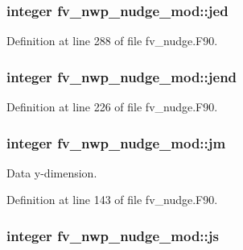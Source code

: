 \subsubsection[{jed}]{\setlength{\rightskip}{0pt plus 5cm}integer fv\-\_\-nwp\-\_\-nudge\-\_\-mod\-::jed\hspace{0.3cm}{\ttfamily [private]}}\label{classfv__nwp__nudge__mod_a6354a59117d0add11183736f6f9c055a}


Definition at line 288 of file fv\-\_\-nudge.\-F90.

\subsubsection[{jend}]{\setlength{\rightskip}{0pt plus 5cm}integer fv\-\_\-nwp\-\_\-nudge\-\_\-mod\-::jend\hspace{0.3cm}{\ttfamily [private]}}\label{classfv__nwp__nudge__mod_aefbee267032d4df68a60b6e8cab3018b}


Definition at line 226 of file fv\-\_\-nudge.\-F90.

\subsubsection[{jm}]{\setlength{\rightskip}{0pt plus 5cm}integer fv\-\_\-nwp\-\_\-nudge\-\_\-mod\-::jm\hspace{0.3cm}{\ttfamily [private]}}\label{classfv__nwp__nudge__mod_a14bdbe362e391feaf152589a422108c9}


Data y-\/dimension. 



Definition at line 143 of file fv\-\_\-nudge.\-F90.

\subsubsection[{js}]{\setlength{\rightskip}{0pt plus 5cm}integer fv\-\_\-nwp\-\_\-nudge\-\_\-mod\-::js\hspace{0.3cm}{\ttfamily [private]}}\label{classfv__nwp__nudge__mod_ad9f936f9336b43e00bcc6fa4fd1d4f6a}


